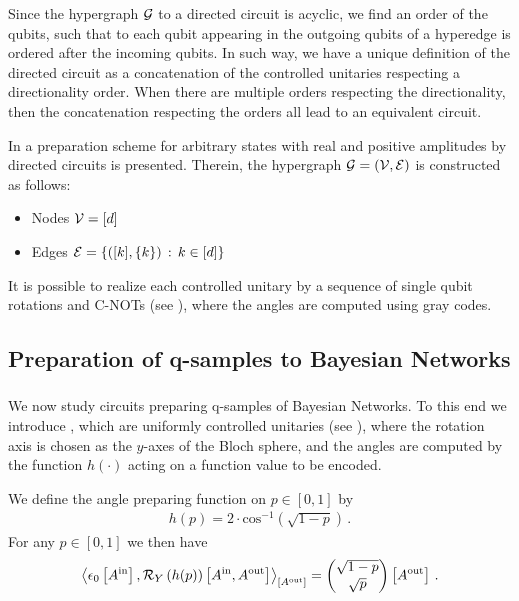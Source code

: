 Since the hypergraph $\mathcal{G}$ to a directed circuit is acyclic, we find an order of the qubits, such that to each qubit appearing in the outgoing qubits of a hyperedge is ordered after the incoming qubits.
In such way, we have a unique definition of the directed circuit as a concatenation of the controlled unitaries respecting a directionality order.
When there are multiple orders respecting the directionality, then the concatenation respecting the orders all lead to an equivalent circuit.

\begin{example}
    \label{exa:genericControlCircuit}
    In \cite{mottonen_transformation_2005} a preparation scheme for arbitrary states with real and positive amplitudes by directed circuits is presented.
    Therein, the hypergraph $\mathcal{G}=(\mathcal{V},\mathcal{E})$ is constructed as follows:
    \begin{itemize}
        \item Nodes $\mathcal{V}={[d]}$
        \item Edges $\mathcal{E}=\left\{([k],\{k\})\,:\,k\in[d]\right\}$
    \end{itemize}
    It is possible to realize each controlled unitary by a sequence of single qubit rotations and C-NOTs (see \cite{mottonen_transformation_2005}), where the angles are computed using gray codes.
\end{example}


\subsection{Preparation of q-samples to Bayesian Networks} %

\subsubsection{\ActivationCircuits{}}

We now study circuits preparing q-samples of Bayesian Networks.
To this end we introduce \activationCircuits{}, which are uniformly controlled unitaries (see \cite{mottonen_transformation_2005}), where the rotation axis is chosen as the $y$-axes of the Bloch sphere, and the angles are computed by the function $h(\cdot)$ acting on a function value to be encoded.

We define the angle preparing function on $p\in[0,1]$ by
\begin{align*}
    h(p) = 2 \cdot \mathrm{cos}^{-1}\left(\sqrt{1-p}\right) \, .
\end{align*}
For any $p\in[0,1]$ we then have
\begin{align*}
    \left\langle \epsilon_{0}\left[A^{\mathrm{in}}\right],\mathcal{R}_Y\left({h(p)}\right)\left[A^{\mathrm{in}},A^{\mathrm{out}}\right]\right\rangle_{\left[ A^{\mathrm{out}} \right]}
    = \begin{pmatrix} \sqrt{1-p} \\ \sqrt{p} \end{pmatrix}\left[A^{\mathrm{out}}\right] \, .
\end{align*}

